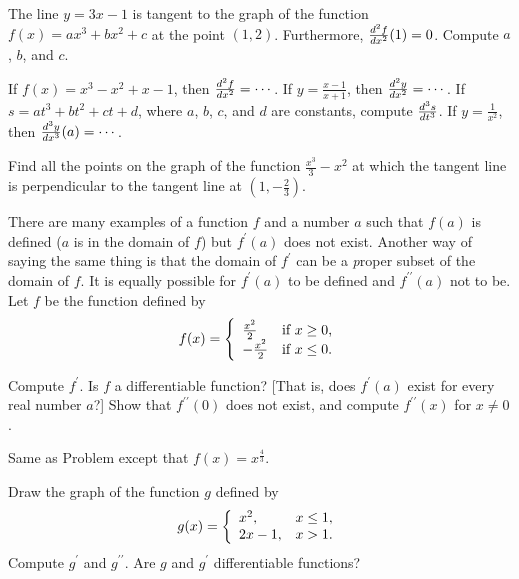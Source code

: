 \begin{exercises}
The line $y = 3x - 1$ is tangent to the graph of the function
$f(x) = ax^3 + bx^2 + c$ at the point $(1,2)$.
Furthermore, $\frac{d^{2}{f}}{dx^{2}} (1) = 0$.  Compute $a$, $b$, and $c$.

\begin{exenum}
\sx
If $f(x) = x^3 - x^2 +x -1$, then $\frac{d^{2}{f}}{dx^{2}} = \cdots$.
\sx
If $y = \frac{x-1}{x+1}$, then $\frac{d^{2}{y}}{dx^{2}} = \cdots$.
\sx
If $s = at^3 + bt^2 + ct + d$, where $a$, $b$, $c$, and $d$ are constants,
compute $\frac{d^{3}{s}}{d{t}^{3}}$.
\sx
If $y = \frac1{x^2}$, then $\frac{d^{3}{y}}{dx^{3}} (a) = \cdots$.
\end{exenum}

Find all the points on the graph of the function $\frac{x^3}3 - x^2$ at
which the tangent line is perpendicular to the tangent line at $(1, -\frac23)$.

There are many examples of a function $f$ and a number $a$
such that $f(a)$ is defined ($a$ is in the domain of $f$) but
$f^\prime(a)$ does not exist.  Another way of saying the same thing
is that the domain of $f^\prime$ can be a {\emph proper} subset
of the domain of $f$.  It is equally possible for $f^\prime (a)$ to be
defined and $f^{\prime\prime} (a)$ not to be.  Let $f$ be the function
defined by
\[
f(x) = \left\{ \begin{array}{ll} \frac{x^2}2 & \mbox{if $x\geq 0$,} \\ -\frac{x^2}2 & \mbox{if $x\leq 0$.} \end{array} \right.
\]
\begin{exenum}
\sx
Compute $f^\prime$.
\sx
Is $f$ a differentiable function?
[That is, does $f^\prime(a)$ exist for every real number $a$?]
\sx
Show that $f^{\prime\prime}(0)$ does not exist,
and compute $f^{\prime\prime}(x)$ for $x\ne 0$.
\end{exenum}

Same as Problem  except that $f(x) = x^{\frac43}$.

\begin{exenum}
\sx
Draw the graph of the function $g$ defined by
\[
g(x) = \left\{ \begin{array}{ll} x^2, & x \leq 1, \\ 2x-1, & x > 1. \end{array} \right.
\]
\sx
Compute $g^\prime$ and $g^{\prime\prime}$.
\sx
Are $g$ and $g^\prime$ differentiable functions?
\end{exenum}

\end{exercises}
